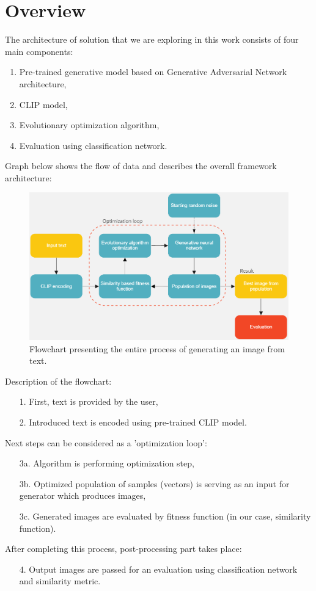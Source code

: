 \documentclass[12pt,a4paper,openany]{book}
\begin{document}
\section{Overview}

The architecture of solution that we are exploring in this work consists of four main components:
\begin{enumerate}
\item Pre-trained generative model based on Generative Adversarial Network architecture,
\item CLIP model,
\item Evolutionary optimization algorithm,
\item Evaluation using classification network.
\end{enumerate}
Graph below shows the flow of data and describes the overall framework architecture:\\


\begin{figure}[H]
    \centering
    \includegraphics[scale=0.6]{figs/flow.png}
    \caption{Flowchart presenting the entire process of generating an image from text.}\label{Fig:flow}
\end{figure}

\noindent Description of the flowchart:
\begin{enumerate}
\item [1.] First, text is provided by the user,
\item [2.] Introduced text is encoded using pre-trained CLIP model.
\end{enumerate}
Next steps can be considered as a 'optimization loop':
\begin{enumerate}
\item [3a.] Algorithm is performing optimization step,
\item [3b.] Optimized population of samples (vectors)  is serving as an input for generator which produces images,
\item [3c.] Generated images are evaluated by fitness function (in our case, similarity function).
\end{enumerate}
After completing this process, post-processing part takes place:
\begin{enumerate}
\item [4.] Output images are passed for an evaluation using classification network and similarity metric.
\end{enumerate}
\end{document}
